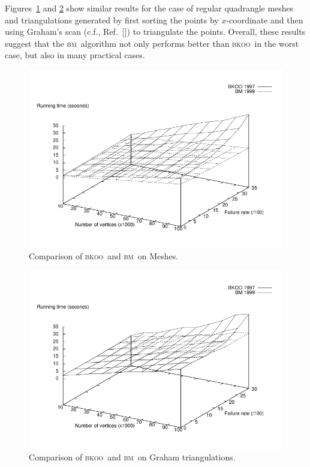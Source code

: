 \documentclass{article}
\newlength{\graphheight}
\newcommand{\figlabel}[1]{\label{fig:#1}}
\newcommand{\bkoo}{\textsc{bkoo}}
\newcommand{\bosemorin}{\textsc{bm}}
\begin{document}
Figures~\ref{fig:mesh} and \ref{fig:graham} show similar results for
the case of regular quadrangle meshes and triangulations generated by
first sorting the points by $x$-coordinate and then using Graham's
scan (c.f., Ref.~[\cite{ps85}]) to triangulate the points.  Overall, these
results suggest that the \bosemorin\ algorithm not only performs better than
\bkoo\ in the worst case, but also in many practical cases.

\begin{figure}
\centerline{\includegraphics[height=\graphheight]{mesh}}
\caption{Comparison of \bkoo\ and \bosemorin\ on Meshes.}
\figlabel{mesh}
\end{figure}

\begin{figure}
\centerline{\includegraphics[height=\graphheight]{graham}}
\caption{Comparison of \bkoo\ and \bosemorin\ on Graham triangulations.}
\figlabel{graham}
\end{figure}
\end{document}
